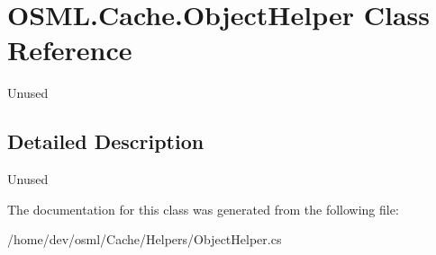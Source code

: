 \hypertarget{classOSML_1_1Cache_1_1ObjectHelper}{}\section{O\+S\+M\+L.\+Cache.\+Object\+Helper Class Reference}
\label{classOSML_1_1Cache_1_1ObjectHelper}


Unused  




\subsection{Detailed Description}
Unused 



The documentation for this class was generated from the following file\+:\begin{DoxyCompactItemize}
\item 
/home/dev/osml/\+Cache/\+Helpers/Object\+Helper.\+cs\end{DoxyCompactItemize}
